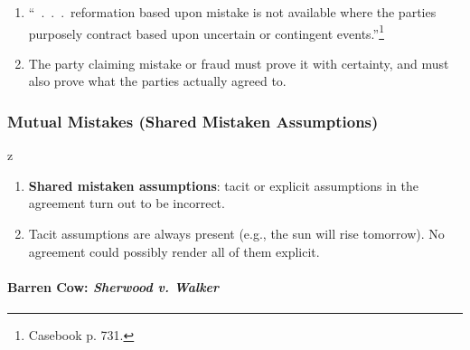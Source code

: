 \begin{enumerate}
    \item ``~.~.~.~reformation based upon mistake is not available where the 
    parties purposely contract based upon uncertain or contingent 
    events.''\footnote{Casebook p. 731.}
    \item The party claiming mistake or fraud must prove it with certainty, 
    and must also prove what the parties actually agreed to.
\end{enumerate}

\subsubsection{Mutual Mistakes (Shared Mistaken Assumptions)}
z
\begin{enumerate}
    \item \textbf{Shared mistaken assumptions}: tacit or explicit assumptions 
    in the agreement turn out to be incorrect.
    \item Tacit assumptions are always present (e.g., the sun will rise 
    tomorrow). No agreement could possibly render all of them explicit.
\end{enumerate}

\paragraph{Barren Cow: \emph{Sherwood v. Walker}}

